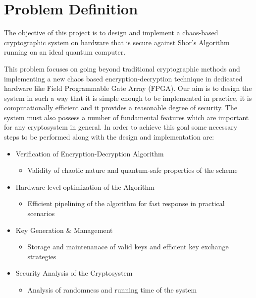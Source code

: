 \section{Problem Definition}
The objective of this project is to design and implement a chaos-based cryptographic system on hardware that is secure against Shor's Algorithm running on an ideal quantum computer.

This problem focuses on going beyond traditional cryptographic methods and implementing a new chaos based encryption-decryption technique in dedicated hardware like Field Programmable Gate Array (FPGA). Our aim is to design the system in such a way that it is simple enough to be implemented in practice, it is computationally efficient and it provides a reasonable degree of security. The system must also possess a number of fundamental features which are important for any cryptosystem in general. In order to achieve this goal some necessary steps to be performed along with the design and implementation are:
\begin{itemize}
  \item Verification of Encryption-Decryption Algorithm
    \begin{itemize}
        \item Validity of chaotic nature and quantum-safe properties of the scheme
    \end{itemize}

  \item Hardware-level optimization of the Algorithm
    \begin{itemize}
        \item Efficient pipelining of the algorithm for fast response in practical scenarios
    \end{itemize}
  \item Key Generation \& Management
    \begin{itemize}
        \item Storage and maintenanace of valid keys and efficient key exchange strategies
    \end{itemize}
  \item Security Analysis of the Cryptosystem
    \begin{itemize}
        \item Analysis of randomness and running time of the system
    \end{itemize}
\end{itemize}
